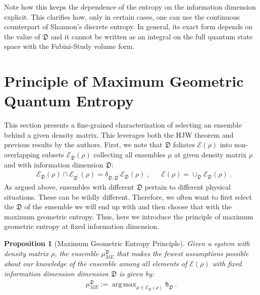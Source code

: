 \documentclass[draft,nofootinbib,pre,twocolumn,showpacs,showkeys,groupaddress,preprintnumbers,floatfix]{revtex4-1}
\newtheorem{proposition}{Proposition}
\DeclareMathOperator*{\argmax}{arg\,max}
\newcommand{\1}{\mathbbm{1}}
\newcommand{\ID}{\mathfrak{D}}
\newcommand{\GE}{\mathfrak{h}_{\ID}}
\begin{document}
Note how this keeps the dependence of the entropy on the information dimension
explicit. This clarifies how, only in certain cases, one can use the continuous
counterpart of Shannon's discrete entropy. In general, its exact form depends
on the value of $\mathfrak{D}$ and it cannot be written as an integral on the
full quantum state space with the Fubini-Study volume form.

\section{Principle of Maximum Geometric Quantum Entropy}
\label{sec:max_geom_ent}

This section presents a fine-grained characterization of selecting an ensemble
behind a given density matrix.  This leverages both the HJW theorem and
previous results by the authors. First, we note that $\ID$ foliates
$\mathcal{E}(\rho)$ into non-overlapping subsets $\mathcal{E}_{\ID}(\rho)$
collecting all ensembles $\mu$ at given density matrix $\rho$ and with
information dimension $\ID$:
\begin{align*}
& \mathcal{E}_{\ID}(\rho) \cap \mathcal{E}_{\ID^{'}}(\rho) = \delta_{\ID,\ID^{'}} \mathcal{E}_{\ID}(\rho)~, && \mathcal{E}(\rho) = \cup_{\ID} \mathcal{E}_{\ID}(\rho)
  ~.
\end{align*}
As argued above, ensembles with different $\ID$ pertain to different physical
situations. These can be wildly different. Therefore, we often want to first select 
the $\ID$ of the ensemble we will end up with and then choose that with the 
maximum geometric entropy. Thus, here we introduce the principle of maximum 
geometric entropy at fixed information dimension.

\begin{proposition}[Maximum Geometric Entropy Principle]
Given a system with density matrix $\rho$, the ensemble $\mu_{ME}^{\ID}$ that
makes the fewest assumptions possible about our knowledge of the ensemble among
all elements of $\mathcal{E}(\rho)$ with fixed information dimension dimension
$\ID$ is given by:
\begin{align*}
\mu_{ME}^{\ID}:= \argmax_{\mu \in \mathcal{E}_{\ID}(\rho)} \GE
  ~.
\end{align*}
\end{proposition}
\end{document}
